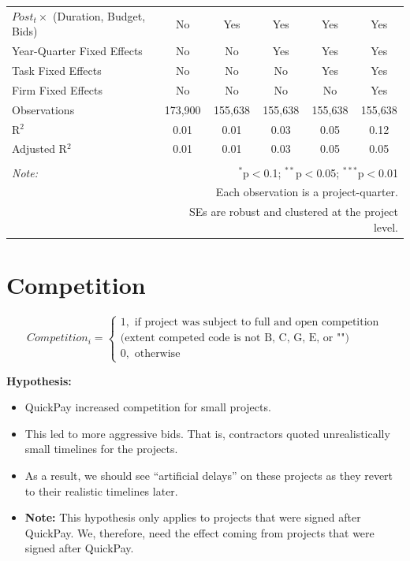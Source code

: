 \documentclass[
]{article}
\providecommand{\tightlist}{%
  \setlength{\itemsep}{0pt}\setlength{\parskip}{0pt}}
\begin{document}
\begin{table}[H]
\begin{tabular}{@{\extracolsep{-2pt}}lccccc}
$Post_t \times$  (Duration, Budget, Bids) & No & Yes & Yes & Yes & Yes \\ 
Year-Quarter Fixed Effects & No & No & Yes & Yes & Yes \\ 
Task Fixed Effects & No & No & No & Yes & Yes \\ 
Firm Fixed Effects & No & No & No & No & Yes \\ 
Observations & 173,900 & 155,638 & 155,638 & 155,638 & 155,638 \\ 
R$^{2}$ & 0.01 & 0.01 & 0.03 & 0.05 & 0.12 \\ 
Adjusted R$^{2}$ & 0.01 & 0.01 & 0.03 & 0.05 & 0.05 \\ 
\hline 
\hline \\[-1.8ex] 
\textit{Note:}  & \multicolumn{5}{r}{$^{*}$p$<$0.1; $^{**}$p$<$0.05; $^{***}$p$<$0.01} \\ 
 & \multicolumn{5}{r}{Each observation is a project-quarter.} \\ 
 & \multicolumn{5}{r}{SEs are robust and clustered at the project level.} \\ 
\end{tabular} 
\end{table}

\hypertarget{competition}{%
\section{Competition}\label{competition}}

\[ Competition_i = \begin{cases} 1, \text{ if project was subject to full and open competition}\\ 
                       \text{(extent competed code is not B, C, G, E, or "")}\\
0, \text{ otherwise} \end{cases}\]

\textbf{Hypothesis:}

\begin{itemize}
\tightlist
\item
  QuickPay increased competition for small projects.
\item
  This led to more aggressive bids. That is, contractors quoted
  unrealistically small timelines for the projects.
\item
  As a result, we should see ``artificial delays'' on these projects as
  they revert to their realistic timelines later.
\item
  \textbf{Note:} This hypothesis only applies to projects that were
  signed after QuickPay. We, therefore, need the effect coming from
  projects that were signed after QuickPay.
\end{itemize}
\end{document}
